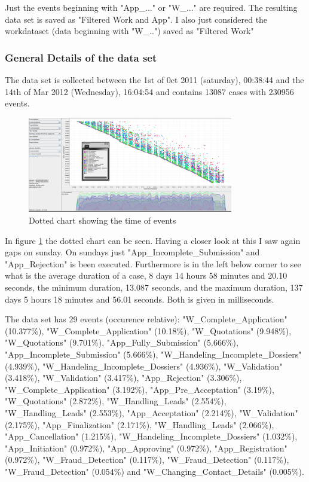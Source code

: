 Just the events beginning with "App\_..." or "W\_..." are required. The resulting data set is saved as "Filtered Work and App". I also just considered the workdataset (data beginning with "W\_..") saved as "Filtered Work"

\subsubsection{General Details of the data set}
The data set is collected between the 1st of 0ct 2011 (saturday), 00:38:44 and the 14th of Mar 2012 (Wednesday), 16:04:54 and contains 13087 cases with 230956 events. 

\begin{figure}[!htbp]
\centering
\includegraphics[width = 0.8\textwidth]{AppWorkDot.PNG}
\caption{Dotted chart showing the time of events}
\label{fig:AppWorkTimeFlow}
\end{figure}

In figure \ref{fig:AppWorkTimeFlow} the dotted chart can be seen. Having a closer look at this I saw again gaps on sunday. On sundays just "App\_Incomplete\_Submission" and "App\_Rejection" is been executed. Furthermore is in the left below corner to see what is the average duration of a case, 8 days 14 hours 58 minutes and 20.10 seconds, the minimum duration, 13.087 seconds, and the maximum duration, 137 days 5 hours 18 minutes and 56.01 seconds. Both is given in milliseconds.

The data set has 29 events (occurence relative): 
"W\_Complete\_Application" (10.377\%), "W\_Complete\_Application" (10.18\%), "W\_Quotations" (9.948\%), "W\_Quotations" (9.701\%), "App\_Fully\_Submission" (5.666\%), "App\_Incomplete\_Submission" (5.666\%), "W\_Handeling\_Incomplete\_Dossiers" (4.939\%), "W\_Handeling\_Incomplete\_Dossiers" (4.936\%), "W\_Validation" (3.418\%), "W\_Validation" (3.417\%), "App\_Rejection" (3.306\%), "W\_Complete\_Application" (3.192\%), "App\_Pre\_Acceptation" (3.19\%), "W\_Quotations" (2.872\%), "W\_Handling\_Leads" (2.554\%), "W\_Handling\_Leads" (2.553\%), "App\_Acceptation" (2.214\%), "W\_Validation" (2.175\%), "App\_Finalization" (2.171\%), "W\_Handling\_Leads" (2.066\%), "App\_Cancellation" (1.215\%), "W\_Handeling\_Incomplete\_Dossiers" (1.032\%), "App\_Initiation" (0.972\%), "App\_Approving" (0.972\%), "App\_Registration" (0.972\%), "W\_Fraud\_Detection" (0.117\%), "W\_Fraud\_Detection" (0.117\%), "W\_Fraud\_Detection" (0.054\%) and "W\_Changing\_Contact\_Details" (0.005\%).

